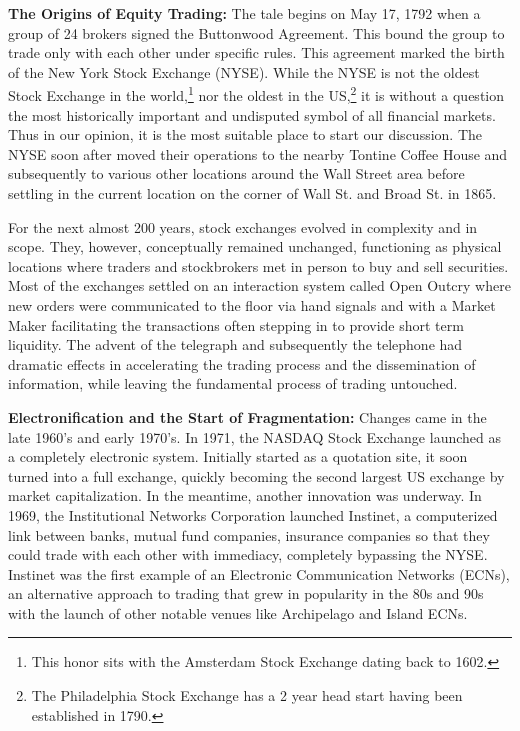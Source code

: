 \noindent\textbf{The Origins of Equity Trading:} The tale begins on May 17, 1792 when a group of 24 brokers signed the Buttonwood Agreement. This bound the group to trade only with each other under specific rules. This agreement marked the birth of the New York Stock Exchange (NYSE). While the NYSE is not the oldest Stock Exchange in the world,\footnote{This honor sits with the Amsterdam Stock Exchange dating back to 1602.} nor the oldest in the US,\footnote{The Philadelphia Stock Exchange has a 2 year head start having been established in 1790.} it is without a question the most historically important and undisputed symbol of all financial markets. Thus in our opinion, it is the most suitable place to start our discussion. The NYSE soon after moved their operations to the nearby Tontine Coffee House and subsequently to various other locations around the Wall Street area before settling in the current location on the corner of Wall St. and Broad St. in 1865.


For the next almost 200 years, stock exchanges evolved in complexity and in scope. They, however, conceptually remained unchanged, functioning as physical locations where traders and stockbrokers met in person to buy and sell securities. Most of the exchanges settled on an interaction system called Open Outcry where new orders were communicated to the floor via hand signals and with a Market Maker facilitating the transactions often stepping in to provide short term liquidity. The advent of the telegraph and subsequently the telephone had dramatic effects in accelerating the trading process and the dissemination of information, while leaving the fundamental process of trading untouched. \twomedskip


\noindent\textbf{Electronification and the Start of Fragmentation:} Changes came in the late 1960's and early 1970's. In 1971, the NASDAQ Stock Exchange launched as a completely electronic system. Initially started as a quotation site, it soon turned into a full exchange, quickly becoming the second largest US exchange by market capitalization. In the meantime, another innovation was underway. In 1969, the Institutional Networks Corporation launched Instinet, a computerized link between banks, mutual fund companies, insurance companies so that they could trade with each other with immediacy, completely bypassing the NYSE. Instinet was the first example of an Electronic Communication Networks (ECNs), an alternative approach to trading that grew in popularity in the 80s and 90s with the launch of other notable venues like Archipelago and Island ECNs.


